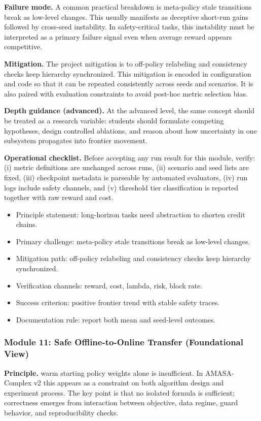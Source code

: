 \documentclass[conference]{IEEEtran}
\begin{document}
\textbf{Failure mode.} A common practical breakdown is meta-policy stale transitions break as low-level changes. This usually manifests as deceptive short-run gains followed by cross-seed instability. In safety-critical tasks, this instability must be interpreted as a primary failure signal even when average reward appears competitive.

\textbf{Mitigation.} The project mitigation is to off-policy relabeling and consistency checks keep hierarchy synchronized. This mitigation is encoded in configuration and code so that it can be repeated consistently across seeds and scenarios. It is also paired with evaluation constraints to avoid post-hoc metric selection bias.

\textbf{Depth guidance (advanced).} At the advanced level, the same concept should be treated as a research variable: students should formulate competing hypotheses, design controlled ablations, and reason about how uncertainty in one subsystem propagates into frontier movement.

\textbf{Operational checklist.} Before accepting any run result for this module, verify: (i) metric definitions are unchanged across runs, (ii) scenario and seed lists are fixed, (iii) checkpoint metadata is parseable by automated evaluators, (iv) run logs include safety channels, and (v) threshold tier classification is reported together with raw reward and cost.

\begin{itemize}[leftmargin=*]
  \item Principle statement: long-horizon tasks need abstraction to shorten credit chains.
  \item Primary challenge: meta-policy stale transitions break as low-level changes.
  \item Mitigation path: off-policy relabeling and consistency checks keep hierarchy synchronized.
  \item Verification channels: reward, cost, lambda, risk, block rate.
  \item Success criterion: positive frontier trend with stable safety traces.
  \item Documentation rule: report both mean and seed-level outcomes.
\end{itemize}


\subsubsection{Module 11: Safe Offline-to-Online Transfer (Foundational View)}
\textbf{Principle.} warm starting policy weights alone is insufficient. In AMASA-Complex v2 this appears as a constraint on both algorithm design and experiment process. The key point is that no isolated formula is sufficient; correctness emerges from interaction between objective, data regime, guard behavior, and reproducibility checks.
\end{document}
